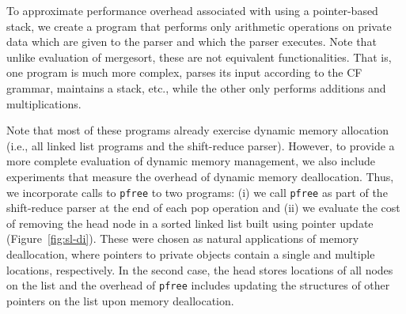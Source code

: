 \documentclass[11pt]{article}
\begin{document}
\begin{enumerate}
  To approximate performance overhead associated with using a pointer-based
  stack, we create a program that performs only arithmetic operations on
  private data which are given to the parser and which the parser executes.
  Note that unlike evaluation of  mergesort, these are not equivalent
  functionalities. That is, one program is much more complex, parses its
  input according to the CF grammar, maintains a stack, etc., while the
  other only performs additions and multiplications.
\end{enumerate}
Note that most of these programs already exercise dynamic memory allocation
(i.e., all linked list programs and the shift-reduce parser). However, to
provide a more complete evaluation of dynamic memory management, we also
include experiments that measure the overhead of dynamic memory
deallocation. Thus, we incorporate calls to \texttt{pfree} to two programs:
(i) we call \texttt{pfree} as part of the shift-reduce parser at the end of
each pop operation and (ii) we evaluate the cost of removing the head node
in a sorted linked list built using pointer update (Figure~\ref{fig:sl-di}).
These were chosen as natural applications of memory deallocation, where
pointers to private objects contain a single and multiple locations,
respectively. In the second case, the head stores locations of all nodes on
the list and the overhead of \texttt{pfree} includes updating the structures
of other pointers on the list upon memory deallocation.
\end{document}
